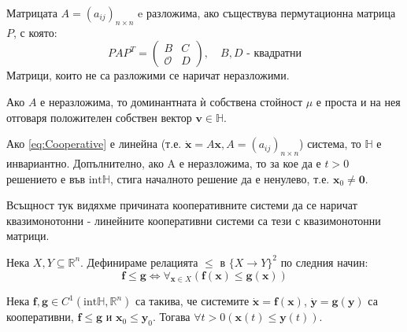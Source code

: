 \begin{definition}
  Матрицата $A=(a_{ij})_{n \times n}$ e разложима, ако съществува пермутационна матрица $P$, с която:
  \begin{equation*}
    PAP^T =
    \begin{pmatrix}
      B & C \\
      \mathscr{O} & D
    \end{pmatrix}, \quad B, D \text{ - квадратни}
  \end{equation*}
  Матрици, които не са разложими се наричат неразложими.
\end{definition}

\begin{theorem}
  Ако $A$ е неразложима, то доминантната ѝ собствена стойност $\mu$ е проста и на нея отговаря положителен собствен вектор $\mathbf{v} \in \mathbb{H}$.
\end{theorem}

\begin{theorem}
  Ако \eqref{eq:Cooperative} е линейна (т.е. $\dot{\mathbf{x}} = A \mathbf{x}, A = (a_{ij})_{n \times n}$) система, то $\mathbb{H}$ е инвариантно. Допълнително, ако A е неразложима, то за кое да е $t > 0$ решението е във $\mathrm{int} \mathbb{H}$, стига началното решение да е ненулево, т.е. $\mathbf{x}_0 \neq \mathbf{0}$.
\end{theorem}

Всъщност тук видяхме причината кооперативните системи да се наричат квазимонотонни - линейните кооперативни системи са тези с квазимонотонни матрици.

\begin{definition}
  Нека $X, Y \subseteq \mathbb{R}^n$. Дефинираме релацията $\leq$ в $\{X \rightarrow Y\}^2$ по следния начин:
  \begin{equation*}
    \mathbf{f} \leq \mathbf{g} \iff \forall_{\mathbf{x} \in X} (\mathbf{f}(\mathbf{x}) \leq \mathbf{g}(\mathbf{x}))
  \end{equation*}
\end{definition}

\begin{theorem}
  \label{thm:Comparison}
  Нека $\mathbf{f}, \mathbf{g} \in C^1(\mathrm{int} \mathbb{H}, \mathbb{R}^n)$ са такива, че системите $\dot{\mathbf{x}}=\mathbf{f}(\mathbf{x})$, $\dot{\mathbf{y}}=\mathbf{g}(\mathbf{y})$ са кооперативни, $\mathbf{f} \leq \mathbf{g}$ и $\mathbf{x}_0 \leq \mathbf{y}_0$. Тогава $\forall{t>0}(\mathbf{x}(t) \leq \mathbf{y}(t))$.
\end{theorem}

